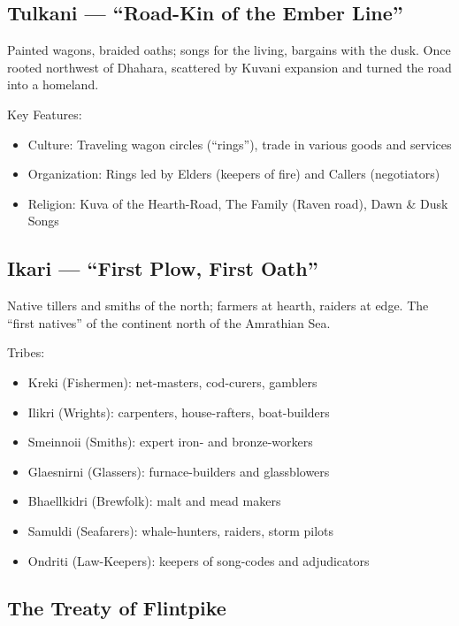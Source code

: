 \subsection{Tulkani --- ``Road-Kin of the Ember Line''}
\label{sec:tulkani}

Painted wagons, braided oaths; songs for the living, bargains with the dusk. Once rooted northwest of Dhahara, scattered by Kuvani expansion and turned the road into a homeland.

Key Features:
\begin{itemize}
    \item Culture: Traveling wagon circles (``rings''), trade in various goods and services
    \item Organization: Rings led by Elders (keepers of fire) and Callers (negotiators)
    \item Religion: Kuva of the Hearth-Road, The Family (Raven road), Dawn \& Dusk Songs
\end{itemize}

\subsection{Ikari --- ``First Plow, First Oath''}
\label{sec:ikari}

Native tillers and smiths of the north; farmers at hearth, raiders at edge. The ``first natives'' of the continent north of the Amrathian Sea.

Tribes:
\begin{itemize}
    \item Kreki (Fishermen): net-masters, cod-curers, gamblers
    \item Ilikri (Wrights): carpenters, house-rafters, boat-builders
    \item Smeinnoii (Smiths): expert iron- and bronze-workers
    \item Glaesnirni (Glassers): furnace-builders and glassblowers
    \item Bhaellkidri (Brewfolk): malt and mead makers
    \item Samuldi (Seafarers): whale-hunters, raiders, storm pilots
    \item Ondriti (Law-Keepers): keepers of song-codes and adjudicators
\end{itemize}

\subsection{The Treaty of Flintpike}
\label{sec:flintpike}

